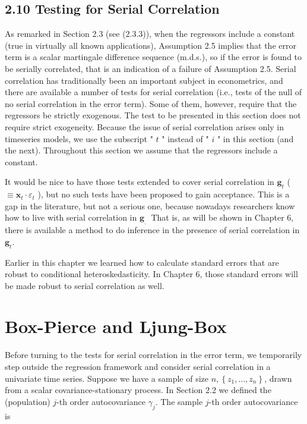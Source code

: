 \documentclass[10pt]{article}
\begin{document}
\subsection*{2.10 Testing for Serial Correlation}
As remarked in Section 2.3 (see (2.3.3)), when the regressors include a constant (true in virtually all known applications), Assumption 2.5 implies that the error term is a scalar martingale difference sequence (m.d.s.), so if the error is found to be serially correlated, that is an indication of a failure of Assumption 2.5. Serial correlation has traditionally been an important subject in econometrics, and there are available a number of tests for serial correlation (i.e., tests of the null of no serial correlation in the error term). Some of them, however, require that the regressors be strictly exogenous. The test to be presented in this section does not require strict exogeneity. Because the issue of serial correlation arises only in timeseries models, we use the subscript " $t$ " instead of " $i$ " in this section (and the next). Throughout this section we assume that the regressors include a constant.

It would be nice to have those tests extended to cover serial correlation in $\mathbf{g}_{t}$ ( $\equiv \mathbf{x}_{t} \cdot \varepsilon_{t}$ ), but no such tests have been proposed to gain acceptance. This is a gap in the literature, but not a serious one, because nowadays researchers know how to live with serial correlation in $\mathbf{g}_{\text {. }}$ That is, as will be shown in Chapter 6, there is available a method to do inference in the presence of serial correlation in $\mathbf{g}_{t}$.

Earlier in this chapter we learned how to calculate standard errors that are robust to conditional heteroskedasticity. In Chapter 6, those standard errors will be made robust to serial correlation as well.

\section*{Box-Pierce and Ljung-Box}
Before turning to the tests for serial correlation in the error term, we temporarily step outside the regression framework and consider serial correlation in a univariate time series. Suppose we have a sample of size $n,\left\{z_{1}, \ldots, z_{n}\right\}$, drawn from a scalar covariance-stationary process. In Section 2.2 we defined the (population) $j$-th order autocovariance $\gamma_{j}$. The sample $j$-th order autocovariance is
\end{document}
